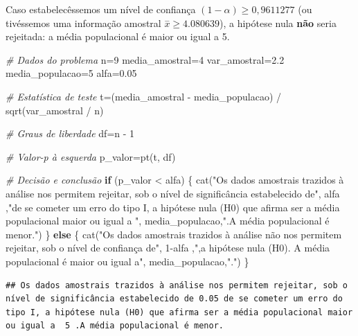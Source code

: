 \documentclass[
]{book}
\newenvironment{Shaded}{\begin{snugshade}}{\end{snugshade}}
\newcommand{\CommentTok}[1]{\textcolor[rgb]{0.56,0.35,0.01}{\textit{#1}}}
\newcommand{\ControlFlowTok}[1]{\textcolor[rgb]{0.13,0.29,0.53}{\textbf{#1}}}
\newcommand{\DecValTok}[1]{\textcolor[rgb]{0.00,0.00,0.81}{#1}}
\newcommand{\FloatTok}[1]{\textcolor[rgb]{0.00,0.00,0.81}{#1}}
\newcommand{\FunctionTok}[1]{\textcolor[rgb]{0.00,0.00,0.00}{#1}}
\newcommand{\NormalTok}[1]{#1}
\newcommand{\OtherTok}[1]{\textcolor[rgb]{0.56,0.35,0.01}{#1}}
\newcommand{\SpecialCharTok}[1]{\textcolor[rgb]{0.00,0.00,0.00}{#1}}
\newcommand{\StringTok}[1]{\textcolor[rgb]{0.31,0.60,0.02}{#1}}
\begin{document}
\hfill\break

Caso estabelecêssemos um nível de confiança \((1-\alpha) \ge 0,9611277\) (ou tivéssemos uma informação amostral \(\stackrel{-}{x} \ge 4.080639\)), a hipótese nula \textbf{não} seria rejeitada: a média populacional é maior ou igual a 5.

\hfill\break

\begin{Shaded}
\begin{Highlighting}[]
\CommentTok{\# Dados do problema}
\NormalTok{n}\OtherTok{=}\DecValTok{9}
\NormalTok{media\_amostral}\OtherTok{=}\DecValTok{4}
\NormalTok{var\_amostral}\OtherTok{=}\FloatTok{2.2}
\NormalTok{media\_populacao}\OtherTok{=}\DecValTok{5}
\NormalTok{alfa}\OtherTok{=}\FloatTok{0.05}

\CommentTok{\# Estatística de teste}
\NormalTok{t}\OtherTok{=}\NormalTok{(media\_amostral }\SpecialCharTok{{-}}\NormalTok{ media\_populacao) }\SpecialCharTok{/} \FunctionTok{sqrt}\NormalTok{(var\_amostral }\SpecialCharTok{/}\NormalTok{ n)}

\CommentTok{\# Graus de liberdade}
\NormalTok{df}\OtherTok{=}\NormalTok{n }\SpecialCharTok{{-}} \DecValTok{1}

\CommentTok{\# Valor{-}p à esquerda}
\NormalTok{p\_valor}\OtherTok{=}\FunctionTok{pt}\NormalTok{(t, df)}


\CommentTok{\# Decisão e conclusão}
\ControlFlowTok{if}\NormalTok{ (p\_valor }\SpecialCharTok{\textless{}}\NormalTok{ alfa) \{}
  \FunctionTok{cat}\NormalTok{(}\StringTok{"Os dados amostrais trazidos à análise nos permitem rejeitar, sob o nível de significância estabelecido de"}\NormalTok{, alfa ,}\StringTok{"de se cometer um erro do tipo I, a hipótese nula (H0) que afirma ser a média populacional maior ou igual a "}\NormalTok{, media\_populacao,}\StringTok{".A média populacional é menor."}\NormalTok{)}
\NormalTok{\} }\ControlFlowTok{else}\NormalTok{ \{}
  \FunctionTok{cat}\NormalTok{(}\StringTok{"Os dados amostrais trazidos à análise não nos permitem rejeitar, sob o nível de confiança de"}\NormalTok{, }\DecValTok{1}\SpecialCharTok{{-}}\NormalTok{alfa ,}\StringTok{",a hipótese nula (H0). A média populacional é maior ou igual a"}\NormalTok{, media\_populacao,}\StringTok{"."}\NormalTok{)}
\NormalTok{\}}
\end{Highlighting}
\end{Shaded}

\begin{verbatim}
## Os dados amostrais trazidos à análise nos permitem rejeitar, sob o nível de significância estabelecido de 0.05 de se cometer um erro do tipo I, a hipótese nula (H0) que afirma ser a média populacional maior ou igual a  5 .A média populacional é menor.
\end{verbatim}
\end{document}
